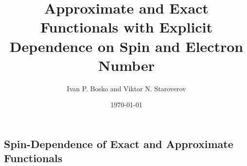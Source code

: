 \documentclass[%
 reprint,
 amsmath,amssymb,
 aps,
pra,
]{revtex4-2}
\begin{document}
\title{Approximate and Exact Functionals with Explicit Dependence on Spin and Electron Number}%

\author{Ivan P. Bosko and Viktor N. Staroverov}
%

\date{\today}

\begin{abstract}

\end{abstract}
\maketitle

\subsection{Spin-Dependence of Exact and Approximate Functionals}
\end{document}
